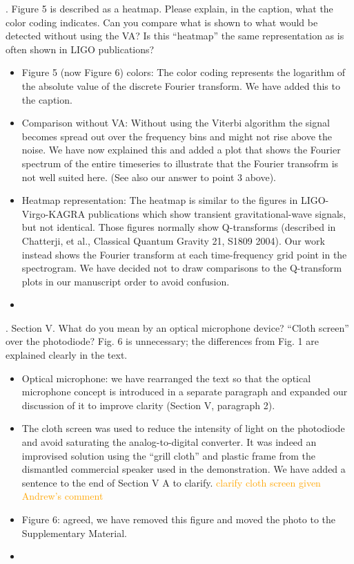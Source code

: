 \documentclass{article}
\newcommand{\han}{\textcolor{orange}}
\begin{document}
. Figure 5 is described as a heatmap.  Please explain, in the caption, what the color coding indicates.  Can you compare what is shown to what would be detected without using the VA?  Is this ``heatmap'' the same representation as is often shown in LIGO publications?
\begin{itemize}
\item Figure 5 (now Figure 6) colors: The color coding represents the logarithm of the absolute value of the discrete Fourier transform. We have added this to the caption.
\item Comparison without VA: Without using the Viterbi algorithm the signal becomes spread out over the frequency bins and might not rise above the noise. We have now explained this and added a plot that shows the Fourier spectrum of the entire timeseries to illustrate that the Fourier transofrm is not well suited here. (See also our answer to point 3 above).
\item Heatmap representation: The heatmap is similar to the figures in LIGO-Virgo-KAGRA publications which show transient gravitational-wave signals, but not identical. Those figures normally show Q-transforms (described in Chatterji, et al., Classical Quantum Gravity 21, S1809 2004). Our work instead shows the Fourier transform at each time-frequency grid point in the spectrogram. We have decided not to draw comparisons to the Q-transform plots in our manuscript order to avoid confusion.
\item[]
\end{itemize}


. Section V.  What do you mean by an optical microphone device?  “Cloth screen” over the photodiode?  Fig. 6 is unnecessary; the differences from Fig. 1 are explained clearly in the text.
\begin{itemize}
\item Optical microphone: we have rearranged the text so that the optical microphone concept is introduced in a separate paragraph and expanded our discussion of it to improve clarity (Section V, paragraph 2).
\item The cloth screen was used to reduce the intensity of light on the photodiode and avoid saturating the analog-to-digital converter. It was indeed an improvised solution using the ``grill cloth'' and plastic frame from the dismantled commercial speaker used in the demonstration. We have added a sentence to the end of Section V A to clarify. \han{clarify cloth screen given Andrew's comment}
\item Figure 6: agreed, we have removed this figure and moved the photo to the Supplementary Material.
\item []
\end{itemize}  
\end{document}
